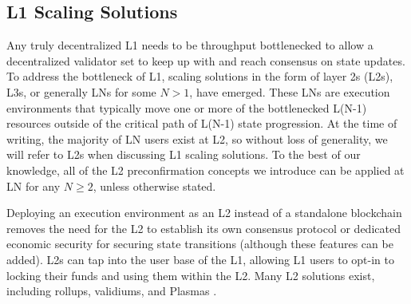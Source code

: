 \documentclass[a4paper]{article}
\theoremstyle{boldstyle}
\begin{document}
\subsection{L1 Scaling Solutions}\label{sec:intro_L2}
Any truly decentralized L1 needs to be throughput bottlenecked to allow a decentralized validator set to keep up with and reach consensus on state updates. To address the bottleneck of L1, scaling solutions in the form of layer 2s (L2s), L3s, or generally LNs for some $N>1$, have emerged. These LNs are execution environments that typically move one or more of the bottlenecked L(N-1) resources outside of the critical path of L(N-1) state progression. At the time of writing, the majority of LN users exist at L2, so without loss of generality, we will refer to L2s when discussing L1 scaling solutions. To the best of our knowledge, all of the L2 preconfirmation concepts we introduce can be applied at LN for any $N\geq 2$, unless otherwise stated.

Deploying an execution environment as an L2 instead of a standalone blockchain removes the need for the L2 to establish its own consensus protocol or dedicated economic security for securing state transitions (although these features can be added). L2s can tap into the user base of the L1, allowing L1 users to opt-in to locking their funds and using them within the L2. Many L2 solutions exist, including rollups, validiums, and Plasmas \cite{L2_versus_execution_sharding}.
\end{document}
